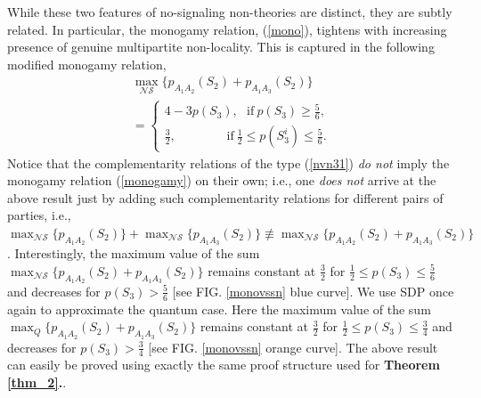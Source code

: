 \documentclass[%
 reprint,
 amsmath,amssymb,
 aps,
]{revtex4-1}
\theoremstyle{plain}
\begin{document}
While these two features of no-signaling non-theories are distinct, they are subtly related. In particular, the monogamy relation, (\ref{mono}), tightens with increasing presence of genuine multipartite non-locality. This is captured in the following modified monogamy relation,
\begin{multline}
\label{monogamy}
  \max_{\mathcal{NS}}\{p_{A_1A_2}({S_{2}})+p_{A_1A_3}({S_{2}})\}\\  
 = \begin{cases}
       4-3p(S_{3}) ,~~~  \text{if}\ p(S_{3}) \geq \frac{5}{6}, \\
       \frac{3}{2}, ~\;\;\;\;\;\;\;\;\;~~~~~~ \text{if}\ \frac{1}{2}\leq  p(S_{3}^i) \leq \frac{5}{6}. 
    \end{cases}{}
\end{multline} 
Notice that the complementarity relations of the type (\ref{nvn31}) \textit{do not} imply the monogamy relation (\ref{monogamy}) on their own; i.e., one \textit{does not} arrive at the above result just by adding such complementarity relations for different pairs of parties, i.e., $\max_{\mathcal{NS}}\{p_{A_1A_2}(S_2)\}+\max_{\mathcal{NS}}\{p_{A_1A_3}(S_2)\} \not \equiv \max_{\mathcal{NS}}\{p_{A_1A_2}(S_2)+p_{A_1A_3}(S_2)\}$. Interestingly, the maximum value of the sum $\max_{\mathcal{NS}}\{p_{A_1A_2}(S_2)+p_{A_1A_3}(S_2)\}$ remains constant at $\frac{3}{2}$ for $\frac{1}{2} \leq p(S_3)\leq \frac{5}{6}$ and decreases for $p(S_3)>\frac{5}{6}$ [see FIG. \ref{monovssn} blue curve]. We use SDP once again to approximate the quantum case. Here the maximum value of the sum $\max_{Q}\{p_{A_1A_2}(S_2)+p_{A_1A_3}(S_2)\}$ remains constant at $\frac{3}{2}$ for $\frac{1}{2} \leq p(S_3)\leq \frac{3}{4}$ and decreases for $p(S_3)>\frac{3}{4}$ [see FIG. \ref{monovssn} orange curve].	
 The above result can easily be proved using exactly the same proof structure used for \textbf{Theorem \ref{thm_2}.}. 
\end{document}
